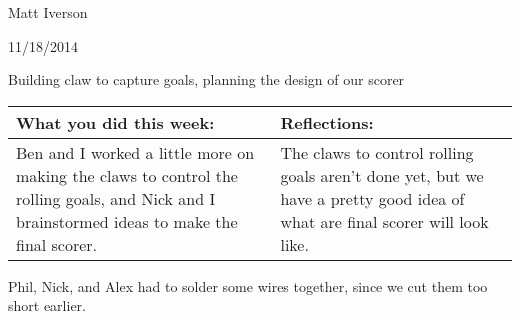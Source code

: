 Matt Iverson

11/18/2014

Building claw to capture goals, planning the design of our scorer

\begin{tabular}{|p{5cm}|p{5cm}|}
 \hline
 What you did this week:
 &
 Reflections:
 \\
 \hline
 Ben and I worked a little more on making the claws to control the rolling goals, and Nick and I brainstormed ideas to make the final scorer.
 &
 The claws to control rolling goals aren't done yet, but we have a pretty good idea of what are final scorer will look like.
 \\
 \hline
\end{tabular}


Phil, Nick, and Alex had to solder some wires together, since we cut them too short earlier.

